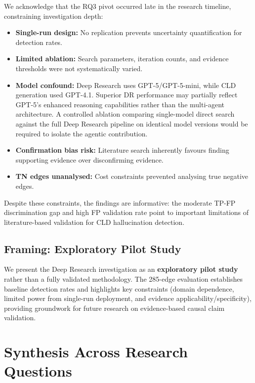 We acknowledge that the RQ3 pivot occurred late in the research timeline, constraining investigation depth:
\begin{itemize}[noitemsep]
    \item \textbf{Single-run design:} No replication prevents uncertainty quantification for detection rates.
    \item \textbf{Limited ablation:} Search parameters, iteration counts, and evidence thresholds were not systematically varied.
    \item \textbf{Model confound:} Deep Research uses GPT-5/GPT-5-mini, while CLD generation used GPT-4.1. Superior DR performance may partially reflect GPT-5's enhanced reasoning capabilities rather than the multi-agent architecture. A controlled ablation comparing single-model direct search against the full Deep Research pipeline on identical model versions would be required to isolate the agentic contribution.
    \item \textbf{Confirmation bias risk:} Literature search inherently favours finding supporting evidence over disconfirming evidence.
    \item \textbf{TN edges unanalysed:} Cost constraints prevented analysing true negative edges.
\end{itemize}

Despite these constraints, the findings are informative: the moderate TP-FP discrimination gap and high FP validation rate point to important limitations of literature-based validation for CLD hallucination detection.

\subsection{Framing: Exploratory Pilot Study}

We present the Deep Research investigation as an \textbf{exploratory pilot study} rather than a fully validated methodology. The 285-edge evaluation establishes baseline detection rates and highlights key constraints (domain dependence, limited power from single-run deployment, and evidence applicability/specificity), providing groundwork for future research on evidence-based causal claim validation.

\section{Synthesis Across Research Questions}
\label{sec:discussion_synthesis}

